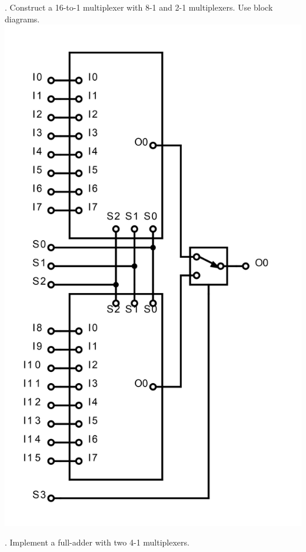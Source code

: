 \documentclass[12pt]{book}
\begin{document}
    . Construct a 16-to-1 multiplexer with 8-1 and 2-1 multiplexers.
    Use block diagrams.
    \includegraphics{q3_16-to-1-MUX}
    
    \vfill
    \pagebreak

    . Implement a full-adder with two 4-1 multiplexers.
    
\end{document}
